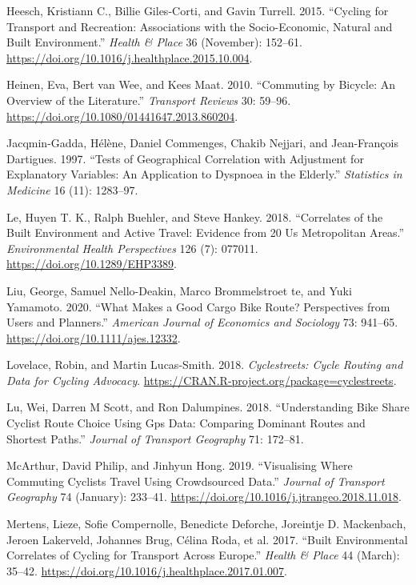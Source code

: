 \documentclass[smallextended]{svjour3}       %
\begin{document}
\leavevmode\hypertarget{ref-Heesch2015}{}%
Heesch, Kristiann C., Billie Giles-Corti, and Gavin Turrell. 2015.
``Cycling for Transport and Recreation: Associations with the
Socio-Economic, Natural and Built Environment.'' \emph{Health \& Place}
36 (November): 152--61.
\url{https://doi.org/10.1016/j.healthplace.2015.10.004}.

\leavevmode\hypertarget{ref-heinenCommutingBicycleOverview2010}{}%
Heinen, Eva, Bert van Wee, and Kees Maat. 2010. ``Commuting by Bicycle:
An Overview of the Literature.'' \emph{Transport Reviews} 30: 59--96.
\url{https://doi.org/10.1080/01441647.2013.860204}.

\leavevmode\hypertarget{ref-Jacqmin1997}{}%
Jacqmin-Gadda, Hélène, Daniel Commenges, Chakib Nejjari, and
Jean-François Dartigues. 1997. ``Tests of Geographical Correlation with
Adjustment for Explanatory Variables: An Application to Dyspnoea in the
Elderly.'' \emph{Statistics in Medicine} 16 (11): 1283--97.

\leavevmode\hypertarget{ref-Le2018}{}%
Le, Huyen T. K., Ralph Buehler, and Steve Hankey. 2018. ``Correlates of
the Built Environment and Active Travel: Evidence from 20 Us
Metropolitan Areas.'' \emph{Environmental Health Perspectives} 126 (7):
077011. \url{https://doi.org/10.1289/EHP3389}.

\leavevmode\hypertarget{ref-liuWhatMakesGood2020}{}%
Liu, George, Samuel Nello-Deakin, Marco Brommelstroet te, and Yuki
Yamamoto. 2020. ``What Makes a Good Cargo Bike Route? Perspectives from
Users and Planners.'' \emph{American Journal of Economics and Sociology}
73: 941--65. \url{https://doi.org/10.1111/ajes.12332}.

\leavevmode\hypertarget{ref-Lovelace2018}{}%
Lovelace, Robin, and Martin Lucas-Smith. 2018. \emph{Cyclestreets: Cycle
Routing and Data for Cycling Advocacy}.
\url{https://CRAN.R-project.org/package=cyclestreets}.

\leavevmode\hypertarget{ref-Lu2018understanding}{}%
Lu, Wei, Darren M Scott, and Ron Dalumpines. 2018. ``Understanding Bike
Share Cyclist Route Choice Using Gps Data: Comparing Dominant Routes and
Shortest Paths.'' \emph{Journal of Transport Geography} 71: 172--81.

\leavevmode\hypertarget{ref-McArthur2019}{}%
McArthur, David Philip, and Jinhyun Hong. 2019. ``Visualising Where
Commuting Cyclists Travel Using Crowdsourced Data.'' \emph{Journal of
Transport Geography} 74 (January): 233--41.
\url{https://doi.org/10.1016/j.jtrangeo.2018.11.018}.

\leavevmode\hypertarget{ref-Mertens2017}{}%
Mertens, Lieze, Sofie Compernolle, Benedicte Deforche, Joreintje D.
Mackenbach, Jeroen Lakerveld, Johannes Brug, Célina Roda, et al. 2017.
``Built Environmental Correlates of Cycling for Transport Across
Europe.'' \emph{Health \& Place} 44 (March): 35--42.
\url{https://doi.org/10.1016/j.healthplace.2017.01.007}.
\end{document}
